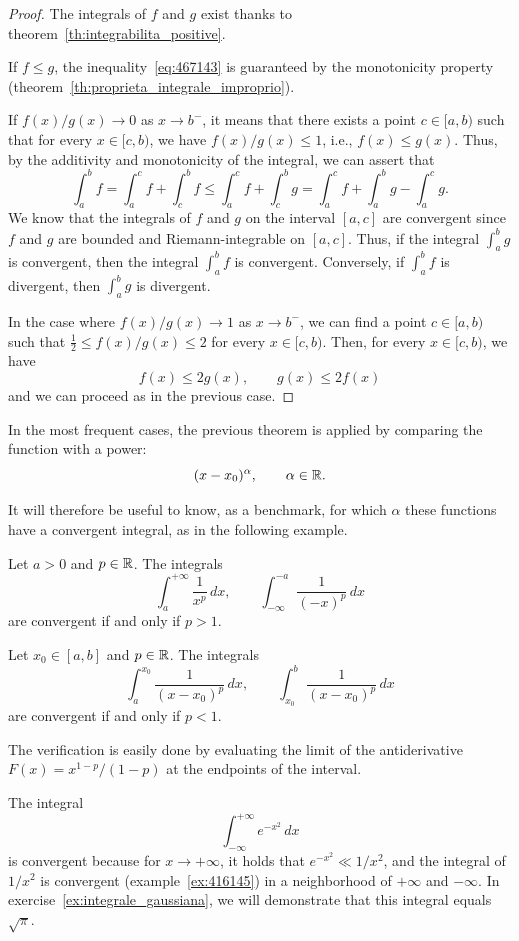 \begin{proof}
\mymark{**}
The integrals of $f$ and $g$ exist thanks to
theorem~\ref{th:integrabilita_positive}.

If $f\le g$, the inequality~\eqref{eq:467143} is guaranteed by the monotonicity
property (theorem~\ref{th:proprieta_integrale_improprio}).

If $f(x)/g(x) \to 0$ as $x\to b^-$, it means that there exists a point
$c\in[a,b)$ such that for every $x\in [c,b)$, we have $f(x)/g(x)\le 1$, i.e.,
$f(x)\le g(x)$. Thus, by the additivity and monotonicity of the integral, we can
assert that
\[
  \int_a^b f
  = \int_a^c f + \int_c^b f
  \le \int_a^c f + \int_c^b g
  = \int_a^c f + \int_a^b g - \int_a^c g.
\]
We know that the integrals of $f$ and $g$ on the interval $[a,c]$ are convergent
since $f$ and $g$ are bounded and Riemann-integrable on $[a,c]$. Thus, if the
integral $\int_a^b g$ is convergent, then the integral $\int_a^b f$ is
convergent. Conversely, if $\int_a^b f$ is divergent, then $\int_a^b g$ is
divergent.

In the case where $f(x)/g(x)\to 1$ as $x\to b^-$, we can find a point
$c\in[a,b)$ such that $\frac 1 2 \le f(x)/g(x) \le 2$ for every $x\in [c,b)$.
Then, for every $x\in [c,b)$, we have
\[
f(x) \le 2g(x), \qquad g(x) \le 2 f(x)
\]
and we can proceed as in the previous case.
\end{proof}

In the most frequent cases, the previous theorem is applied by comparing the
function with a power:
\[
  (x-x_0)^\alpha, \qquad \alpha \in {\mathbb R}.
\]

It will therefore be useful to know, as a benchmark, for which $\alpha$ these
functions have a convergent integral, as in the following example.

\begin{example}
\label{ex:416145}%
\mymark{***}%
Let $a>0$ and $p\in {\mathbb R}$. The integrals
\[
  \int_{a}^{+\infty}\frac{1}{x^p}\, dx,
  \qquad
  \int_{-\infty}^{-a}\frac{1}{(-x)^p}\, dx
\]
are convergent if and only if $p>1$.

Let $x_0\in [a,b]$ and $p\in{\mathbb R}$. The integrals
\[
  \int_a^{x_0} \frac{1}{(x-x_0)^p}\, dx,
  \qquad
  \int_{x_0}^b \frac{1}{(x-x_0)^p}\, dx
\]
are convergent if and only if $p<1$.

The verification is easily done by evaluating the limit of the antiderivative
$F(x) = x^{1-p}/(1-p)$ at the endpoints of the interval.
\end{example}

\begin{example}
\label{ex:integrale_gaussiana_finito}%
%
%
%
The integral
\[
 \int_{-\infty}^{+\infty}e^{-x^2}\, dx
\]
is convergent because for $x\to +\infty$, it holds that $e^{-x^2} \ll 1/x^2$,
and the integral of $1/x^2$ is convergent (example~\ref{ex:416145}) in a
neighborhood of $+\infty$ and $-\infty$. In
exercise~\ref{ex:integrale_gaussiana}, we will demonstrate that this integral
equals $\sqrt \pi$.
\end{example}

